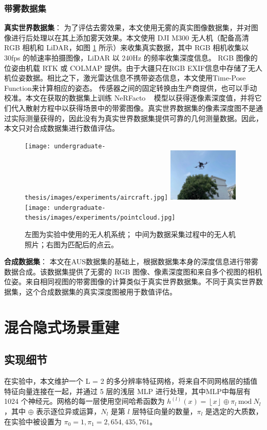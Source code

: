 \subsubsection{带雾数据集}
\textbf{真实世界数据集}：
为了评估去雾效果，本文使用无雾的真实图像数据集，并对图像进行后处理以在其上添加雾天效果。本文使用 DJI M300 无人机（配备高清 RGB 相机和 LiDAR，如图 \ref{fig:real-world-setting} 所示）来收集真实数据，其中 RGB 相机收集以 30fps 的帧速率拍摄图像，LiDAR 以 240Hz 的频率收集深度信息。 RGB 图像的位姿由机载 RTK 或 COLMAP 提供。由于大疆只在RGB EXIF信息中存储了无人机位姿数据。相比之下，激光雷达信息不携带姿态信息，本文使用Time-Pose Function来计算相应的姿态。
传感器之间的固定转换由生产商提供，也可以手动校准。本文在获取的数据集上训练 NeRFacto ~\cite{tancik_nerfstudio_2023} 模型以获得逐像素深度值，并将它们代入散射方程中以获得场景中的带雾图像。真实世界数据集的像素深度图不是通过实际测量获得的，因此没有为真实世界数据集提供可靠的几何测量数据。因此，本文只对合成数据集进行数值评估。

\begin{figure}[ht]
	\begin{center}
	\texttt{[image: undergraduate-thesis/images/experiments/aircraft.jpg]}
	\includegraphics[width=0.3\textwidth]{undergraduate-thesis/images/experiments/flight-near.jpg}
	\texttt{[image: undergraduate-thesis/images/experiments/pointcloud.jpg]}
	\end{center}
	\caption{左图为实验中使用的无人机系统； 中间为数据采集过程中的无人机照片；右图为匹配后的点云。}
	\label{fig:real-world-setting}
\end{figure}

\textbf{合成数据集}：
本文在AUS数据集的基础上，根据数据集本身的深度信息进行带雾数据合成。该数据集提供了无雾的 RGB 图像、像素深度图和来自多个视图的相机位姿。来自相同视图的带雾图像的计算类似于真实世界数据集。不同于真实世界数据集，这个合成数据集的真实深度图被用于数值评估。

\section{混合隐式场景重建}
\subsection{实现细节}
在实验中，本文维护一个 L = 2 的多分辨率特征网格，将来自不同网格层的插值特征向量连接在一起，并通过 5 层的浅层 MLP 进行处理，其中MLP中每层有 1024 个神经元。网格的每一层使用空间哈希函数为 $h^{(l)}(x) = \left\lfloor x\right\rfloor \oplus \pi_l\ \text{mod}\ N_l$，其中 $\oplus$ 表示逐位异或运算，$N_l$ 是第 $l$ 层特征向量的数量，$π_l$ 是选定的大质数，在实验中被设置为 $\pi_0 = 1, \pi_1 = 2,654,435, 761$。

